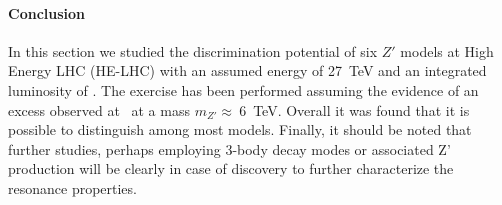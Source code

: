 \paragraph*{Conclusion}
In this section we studied the discrimination potential of six $Z'$ models at High Energy LHC (HE-LHC) with an assumed \com energy of 27~TeV and an integrated luminosity of \intlumihelhc. The exercise has been performed assuming the evidence of an excess observed at \sqrtslhc\ at a mass $m_{Z'}\approx~6$~TeV. Overall it was found that it is possible to distinguish among most models. Finally, it should be noted that further studies, perhaps employing 3-body decay modes or associated Z' production will be clearly in case of discovery to further characterize the resonance properties. 
